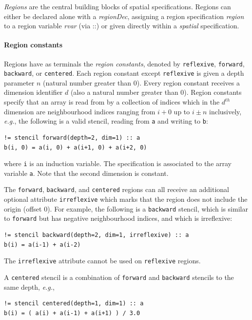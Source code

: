 \documentclass[9pt,preprint]{sigplanconf}
\newcounter{block}
\theoremstyle{definition}
\newcommand{\eg}{\emph{e.g.}}
\newcommand{\nonterm}[1]{\textit{#1}}
\newcommand{\term}[1]{\texttt{#1}}
\begin{document}
\emph{Regions} are the central building blocks of spatial
specifications. Regions can either be declared alone with a
\nonterm{regionDec}, assigning a region specification \nonterm{region} to
a region variable \nonterm{rvar} (via $\texttt{::}$) or given directly within a
\nonterm{spatial} specification.

\paragraph{Region constants}

Regions have as terminals the \emph{region constants}, denoted by
\term{reflexive}, \term{forward}, \term{backward}, or \term{centered}. Each
region constant except \term{reflexive} is given a depth parameter $n$ (natural
number greater than 0). Every region constant receives a dimension identifier $d$ (also a
natural number greater than 0). Region constants specify that an array is read
from by a collection of indices which in the $d^{th}$ dimension are
neighbourhood indices ranging from $i + 0$ up to $i \pm n$ inclusively,
\eg{}, the following is a valid stencil, reading from \term{a} and writing to
\term{b}:
\begin{verbatim}
!= stencil forward(depth=2, dim=1) :: a
b(i, 0) = a(i, 0) + a(i+1, 0) + a(i+2, 0)
\end{verbatim}
where \texttt{i} is an induction variable.  The specification
is associated to the array variable \texttt{a}. Note that the second
dimension is constant.

The \term{forward},
\term{backward}, and \term{centered} regions can all receive an
additional optional attribute \term{irreflexive} which marks
that the region does not include the origin (offset 0).
For example, the following is a \term{backward} stencil, which is similar
to \term{forward} but has negative neighbourhood indices, and which
is irreflexive:
%
\begin{verbatim}
!= stencil backward(depth=2, dim=1, irreflexive) :: a
b(i) = a(i-1) + a(i-2)
\end{verbatim}
%
The \term{irreflexive} attribute cannot be used on \term{reflexive}
regions.

A \texttt{centered} stencil is a combination of \texttt{forward}
and \texttt{backward} stencils to the same depth, \eg{},
\begin{verbatim}
!= stencil centered(depth=1, dim=1) :: a
b(i) = ( a(i) + a(i-1) + a(i+1) ) / 3.0
\end{verbatim}
\end{document}
